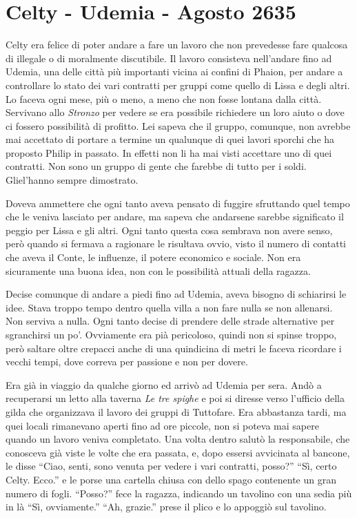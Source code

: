   \section{Celty - Udemia - Agosto 2635}
    
    Celty era felice di poter andare a fare un lavoro che non
    prevedesse fare qualcosa di illegale o di moralmente discutibile. Il
    lavoro consisteva nell'andare fino ad Udemia, una delle città più
    importanti vicina ai confini di Phaion, per andare a controllare lo
    stato dei vari contratti per gruppi come quello di Lissa e degli altri.
    Lo faceva ogni mese, più o meno, a meno che non fosse lontana dalla
    città.
    Servivano allo \emph{Stronzo} per vedere se era possibile richiedere un
    loro aiuto o dove ci fossero possibilità di profitto. Lei sapeva che il
    gruppo, comunque, non avrebbe mai accettato di portare a termine un
    qualunque di quei lavori sporchi che ha proposto Philip in passato. In
    effetti non li ha mai visti accettare uno di quei contratti. Non sono
    un gruppo di gente che farebbe di tutto per i soldi. Gliel'hanno sempre
    dimostrato.

    Doveva ammettere che ogni tanto aveva pensato di fuggire sfruttando
    quel tempo che le veniva lasciato per andare, ma sapeva che andarsene
    sarebbe significato il peggio per Lissa e gli altri. Ogni tanto questa
    cosa sembrava non avere senso, però quando si fermava a ragionare le
    risultava ovvio, visto il numero di contatti che aveva il Conte, le
    influenze, il potere economico e sociale. Non era sicuramente una buona
    idea, non con le possibilità attuali della ragazza.

    Decise comunque di andare a piedi fino ad Udemia, aveva bisogno di
    schiarirsi le idee. Stava troppo tempo dentro quella villa a non fare
    nulla se non allenarsi. Non serviva a nulla. Ogni tanto decise di
    prendere delle strade alternative per sgranchirsi un po'. Ovviamente
    era pià pericoloso, quindi non si spinse troppo, però saltare oltre
    crepacci anche di una quindicina di metri le faceva ricordare i vecchi
    tempi, dove correva per passione e non per dovere.

    Era già in viaggio da qualche giorno ed arrivò ad Udemia per sera.
    Andò a recuperarsi un letto alla taverna \emph{Le tre spighe} e poi si
    diresse verso l'ufficio della gilda che organizzava il lavoro dei
    gruppi di Tuttofare. Era abbastanza tardi, ma quei locali rimanevano
    aperti fino ad ore piccole, non si poteva mai sapere quando un lavoro
    veniva completato. Una volta dentro salutò la responsabile, che
    conosceva già viste le volte che era passata, e, dopo essersi
    avvicinata al bancone, le disse ``Ciao, senti, sono venuta per vedere i
    vari contratti, posso?'' ``Sì, certo Celty. Ecco.'' e le porse una
    cartella chiusa con dello spago contenente un gran numero di fogli.
    ``Posso?'' fece la ragazza, indicando un tavolino con una sedia più in
    là ``Sì, ovviamente.'' ``Ah, grazie.'' prese il plico e lo appoggiò sul
    tavolino.

